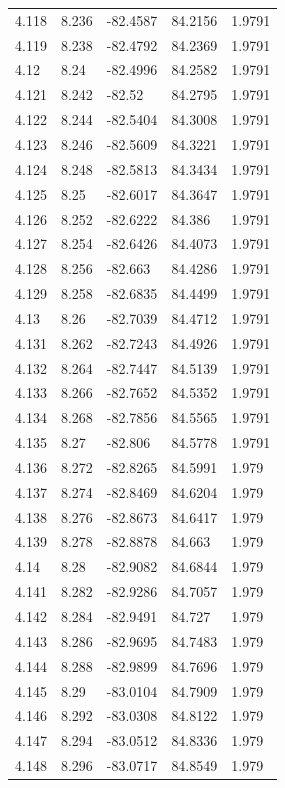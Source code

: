 \begin{tabular}{lllll}
4.118 & 8.236 & -82.4587 & 84.2156 & 1.9791 \\
4.119 & 8.238 & -82.4792 & 84.2369 & 1.9791 \\
4.12 & 8.24 & -82.4996 & 84.2582 & 1.9791 \\
4.121 & 8.242 & -82.52 & 84.2795 & 1.9791 \\
4.122 & 8.244 & -82.5404 & 84.3008 & 1.9791 \\
4.123 & 8.246 & -82.5609 & 84.3221 & 1.9791 \\
4.124 & 8.248 & -82.5813 & 84.3434 & 1.9791 \\
4.125 & 8.25 & -82.6017 & 84.3647 & 1.9791 \\
4.126 & 8.252 & -82.6222 & 84.386 & 1.9791 \\
4.127 & 8.254 & -82.6426 & 84.4073 & 1.9791 \\
4.128 & 8.256 & -82.663 & 84.4286 & 1.9791 \\
4.129 & 8.258 & -82.6835 & 84.4499 & 1.9791 \\
4.13 & 8.26 & -82.7039 & 84.4712 & 1.9791 \\
4.131 & 8.262 & -82.7243 & 84.4926 & 1.9791 \\
4.132 & 8.264 & -82.7447 & 84.5139 & 1.9791 \\
4.133 & 8.266 & -82.7652 & 84.5352 & 1.9791 \\
4.134 & 8.268 & -82.7856 & 84.5565 & 1.9791 \\
4.135 & 8.27 & -82.806 & 84.5778 & 1.9791 \\
4.136 & 8.272 & -82.8265 & 84.5991 & 1.979 \\
4.137 & 8.274 & -82.8469 & 84.6204 & 1.979 \\
4.138 & 8.276 & -82.8673 & 84.6417 & 1.979 \\
4.139 & 8.278 & -82.8878 & 84.663 & 1.979 \\
4.14 & 8.28 & -82.9082 & 84.6844 & 1.979 \\
4.141 & 8.282 & -82.9286 & 84.7057 & 1.979 \\
4.142 & 8.284 & -82.9491 & 84.727 & 1.979 \\
4.143 & 8.286 & -82.9695 & 84.7483 & 1.979 \\
4.144 & 8.288 & -82.9899 & 84.7696 & 1.979 \\
4.145 & 8.29 & -83.0104 & 84.7909 & 1.979 \\
4.146 & 8.292 & -83.0308 & 84.8122 & 1.979 \\
4.147 & 8.294 & -83.0512 & 84.8336 & 1.979 \\
4.148 & 8.296 & -83.0717 & 84.8549 & 1.979 \\

\end{tabular}
